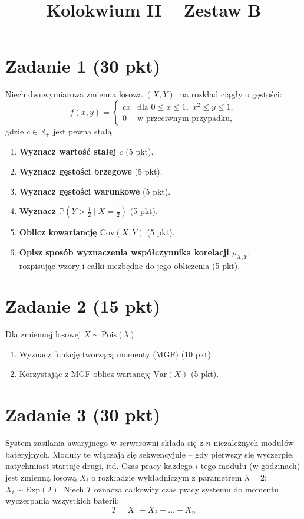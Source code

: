 \documentclass[polish, 10pt]{extarticle}
\begin{document}
\title{Kolokwium II -- Zestaw B}
\author{}
\date{}

\maketitle
\vspace{-2cm}

\section*{Zadanie 1 (30 pkt)}
Niech dwuwymiarowa zmienna losowa $(X, Y)$ ma rozkład ciągły o gęstości:
\[
f(x,y) = 
\begin{cases} 
cx & \text{dla } 0 \le x \le 1, \,\, x^2 \le y \le 1, \\
0 & \text{w przeciwnym przypadku,}
\end{cases}
\]
gdzie $c \in \mathbb{R_+}$ jest pewną stałą.

\begin{enumerate}
    \item[a)] \textbf{Wyznacz wartość stałej $c$} \hfill (5 pkt).
    \item[b)] \textbf{Wyznacz gęstości brzegowe} \hfill (5 pkt).
    \item[c)] \textbf{Wyznacz gęstości warunkowe} \hfill (5 pkt).
    \item[d)] \textbf{Wyznacz $\mathbb P\!\left(Y>\tfrac12\mid X=\tfrac12\right)$} \hfill (5 pkt).
    \item[e)] \textbf{Oblicz kowariancję $\text{Cov}(X, Y)$} \hfill (5 pkt).
    \item[f)] \textbf{Opisz sposób wyznaczenia współczynnika korelacji $\rho_{X,Y}$},\\rozpisując wzory i całki niezbędne do jego obliczenia \hfill (5 pkt).
\end{enumerate}



\section*{Zadanie 2 (15 pkt)}
Dla zmiennej losowej $X\sim \mathrm{Pois}(\lambda)$:
\begin{enumerate}
  \item[a)] Wyznacz funkcję tworzącą momenty (MGF) \hfill (10 pkt).
  \item[b)] Korzystając z MGF oblicz wariancję $\mathrm{Var}(X)$ \hfill (5 pkt).
\end{enumerate}

\section*{Zadanie 3 (30 pkt)}
System zasilania awaryjnego w serwerowni składa się z $n$ niezależnych modułów bateryjnych. Moduły te włączają się sekwencyjnie – gdy pierwszy się wyczerpie, natychmiast startuje drugi, itd. Czas pracy każdego $i$-tego modułu (w godzinach) jest zmienną losową $X_i$ o rozkładzie wykładniczym z parametrem $\lambda = 2$: $X_i \sim \text{Exp}(2)$. Niech $T$ oznacza całkowity czas pracy systemu do momentu wyczerpania wszystkich baterii:
\[
T = X_1 + X_2 + \dots + X_n
\]
\end{document}
